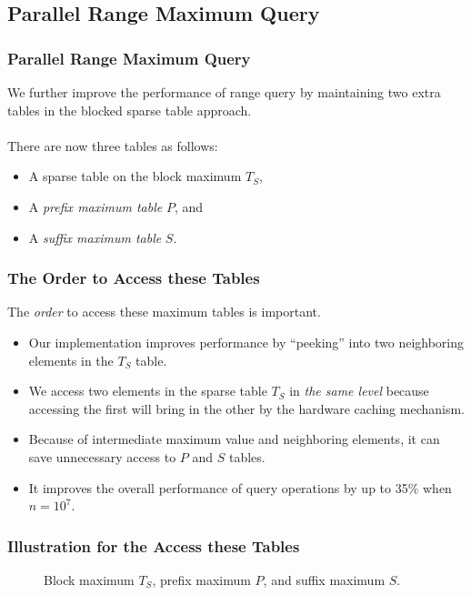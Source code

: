 \subsection{Parallel Range Maximum Query}
\begin{frame}
    \frametitle{Parallel Range Maximum Query}
    We further improve the performance of range query by maintaining two
	extra tables in the blocked sparse table approach.  
	\\~\\
	There are now three tables as follows:

	\begin{itemize}
		\setlength\itemsep{1em}
		\item
			A sparse table on the block maximum $T_S$, 
		\item
			A {\em prefix maximum table} $P$, and 
		\item
			A {\em suffix maximum table} $S$.
	\end{itemize}
\end{frame}

\begin{frame}
	\frametitle{The Order to Access these Tables}
	The {\em order} to access these maximum tables is important.
	\begin{itemize}
		\setlength\itemsep{1em}
		\item
			Our implementation improves performance by ``peeking'' into
			two neighboring elements in the $T_{S}$ table.
		\item 
			We access two elements in the sparse table $T_S$ in {\em the
  			same level} because accessing the first will bring in the
  			other by the hardware caching mechanism.
  		\item
  			Because of intermediate maximum value and neighboring
			elements, it can save unnecessary access to $P$ and $S$
			tables.
		\item
			It improves the overall performance of query operations by
			up to 35\% when $n = 10^7$.
	\end{itemize}
\end{frame}

\begin{withoutheadline}
\begin{frame}
	\frametitle{Illustration for the Access these Tables}
	\begin{center}
	\scalebox{0.7} { \begin{minipage}{1.5\textwidth}
				\begin{figure}[!thb]
				  \centering {}  \caption{Block maximum $T_S$, prefix maximum $P$, and suffix
				    maximum $S$.}
				  \label{fig:compressed-sp-opt}
				\end{figure}
				\end{minipage}
		}
	\end{center}
\end{frame}
\end{withoutheadline}

